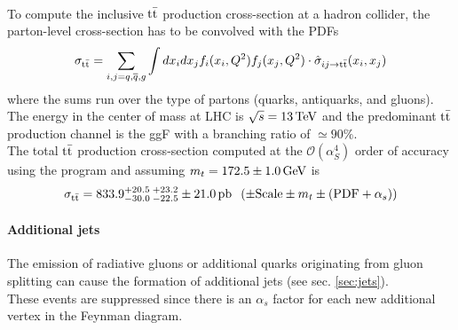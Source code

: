 \\
To compute the inclusive ${{\text{t}}{\bar{\text{t}}}}$ production cross-section at a hadron collider, the parton-level cross-section has to be convolved with the PDFs
\begin{equation}
    \sigma_{\mathrm{t\bar{t}}}=\sum_{i,j=q,\overline{{{q}}},g}\int d x_{i}d x_{j}f_{i}(x_{i},Q^{2})f_{j}(x_{j},Q^{2})\cdot\hat{\sigma}_{i j\rightarrow {\ensuremath{{\text{t}}{\bar{\text{t}}}}}}(x_i,x_j)
\end{equation}
where the sums run over the type of partons (quarks, antiquarks, and gluons).
The energy in the center of mass at LHC is $\sqrt{s}=13 {\,\text{Te\hspace{-.08em}V}}$ and the predominant ${{\text{t}}{\bar{\text{t}}}}$ production channel is the ggF with a branching ratio of $\simeq 90\%$.\\
The total ${{\text{t}}{\bar{\text{t}}}}$ production cross-section computed at the $\mathcal{O} (\alpha_S^4)$ order of accuracy using the program \Toppp \cite{Czakon2014Top++:Colliders} and assuming $m_t=172.5 \pm 1.0 {\,\text{Ge\hspace{-.08em}V}}$ is  \cite{TtbarNNLOTWiki}
\begin{equation}
    \sigma_{{\text{t}}{\bar{\text{t}}}} = 833.9^{+20.5}_{-30.0}\, ^{+23.2}_{-22.5}\pm 21.0\,  \text{pb}\; \; \left( \pm \text{Scale} \pm m_t \pm (\text{PDF}+\alpha_s ) \right)
\end{equation}
\paragraph*{Additional jets}
The emission of radiative gluons or additional quarks originating from gluon splitting can cause the formation of additional jets (see sec. \ref{sec:jets}).\\
These events are suppressed since there is an $\alpha_s$ factor for each new additional vertex in the Feynman diagram.

